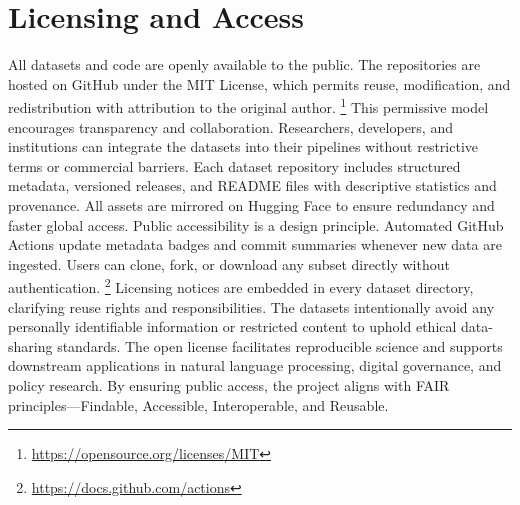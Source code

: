 \documentclass[10pt,a4paper]{article}%
\begin{document}
\section{Licensing and Access}%
\label{sec:LicensingandAccess}%
All datasets and code are openly available to the public. The repositories are hosted on GitHub under the MIT License, which permits reuse, modification, and redistribution with attribution to the original author.%
\footnote{\href{https://opensource.org/licenses/MIT}{https://opensource.org/licenses/MIT}}%
\newline%
\newline%
This permissive model encourages transparency and collaboration. Researchers, developers, and institutions can integrate the datasets into their pipelines without restrictive terms or commercial barriers.%
\citep{OpenDataPractices2020}%
\newline%
\newline%
Each dataset repository includes structured metadata, versioned releases, and README files with descriptive statistics and provenance. All assets are mirrored on Hugging Face to ensure redundancy and faster global access.%
\citep{HuggingFaceDatasets2021}%
\newline%
\newline%
Public accessibility is a design principle. Automated GitHub Actions update metadata badges and commit summaries whenever new data are ingested. Users can clone, fork, or download any subset directly without authentication.%
\footnote{\href{https://docs.github.com/actions}{https://docs.github.com/actions}}%
\newline%
\newline%
Licensing notices are embedded in every dataset directory, clarifying reuse rights and responsibilities. The datasets intentionally avoid any personally identifiable information or restricted content to uphold ethical data{-}sharing standards.%
\citep{EthicalOpenData2019}%
\newline%
\newline%
The open license facilitates reproducible science and supports downstream applications in natural language processing, digital governance, and policy research. By ensuring public access, the project aligns with FAIR principles—Findable, Accessible, Interoperable, and Reusable.%
\citep{FAIRPrinciples2016}%
\newline%
\newline

%
\end{document}
